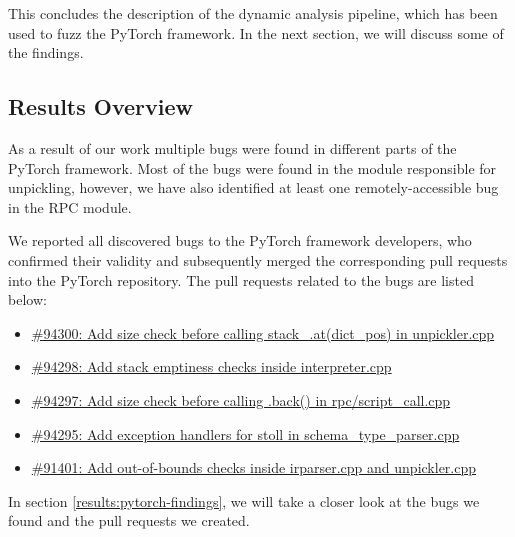 This concludes the description of the dynamic analysis pipeline, which has been used to fuzz the PyTorch framework. In the next section, we will discuss some of the findings.

\subsection{Results Overview}

As a result of our work multiple bugs were found in different parts of the PyTorch framework. Most of the bugs were found in the module responsible for unpickling, however, we have also identified at least one remotely-accessible bug in the RPC module.

We reported all discovered bugs to the PyTorch framework developers, who confirmed their validity and subsequently merged the corresponding pull requests into the PyTorch repository. The pull requests related to the bugs are listed below:

\begin{itemize}
    \item \href{https://github.com/pytorch/pytorch/pull/94300}{\#94300: Add size check before calling stack\_.at(dict\_pos) in unpickler.cpp}
    \item \href{https://github.com/pytorch/pytorch/pull/94298}{\#94298: Add stack emptiness checks inside interpreter.cpp}
    \item \href{https://github.com/pytorch/pytorch/pull/94297}{\#94297: Add size check before calling .back() in rpc/script\_call.cpp}
    \item \href{https://github.com/pytorch/pytorch/pull/94295}{\#94295: Add exception handlers for stoll in schema\_type\_parser.cpp}
    \item \href{https://github.com/pytorch/pytorch/pull/91401}{\#91401: Add out-of-bounds checks inside irparser.cpp and unpickler.cpp}
\end{itemize}

In section \ref{results:pytorch-findings}, we will take a closer look at the bugs we found and the pull requests we created.
